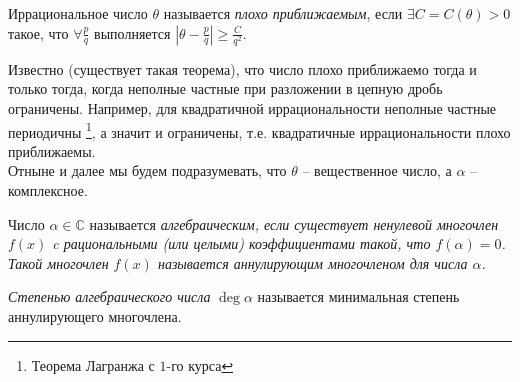 \begin{definition}
	Иррациональное число $\theta$ называется \textit{плохо приближаемым}, если $\exists C = C(\theta) > 0$ такое, что $\forall \frac{p}{q}$ выполняется $\displaystyle \left| \theta - \frac{p}{q} \right| \geq \frac{C}{q^2}$.
\end{definition}

Известно (существует такая теорема), что число плохо приближаемо тогда и только тогда, когда неполные частные при разложении в цепную дробь ограничены.
Например, для квадратичной иррациональности неполные частные периодичны \footnote{Теорема Лагранжа с $1$-го курса}, а значит и ограничены, т.е. квадратичные иррациональности плохо приближаемы.\\
Отныне и далее мы будем подразумевать, что $\theta$ -- вещественное число, а $\alpha$ -- комплексное.

\begin{definition}
	Число $\alpha \in \mathbb{C}$ называется \it{алгебраическим}, если существует ненулевой многочлен $f(x)$ c рациональными (или целыми) коэффициентами такой, что $f(\alpha) = 0$. Такой многочлен $f(x)$ называется аннулирующим многочленом для числа $\alpha$.
\end{definition}

\begin{definition}
	\textit{Степенью алгебраического числа} $\deg \alpha$ называется минимальная степень аннулирующего многочлена.
\end{definition}


